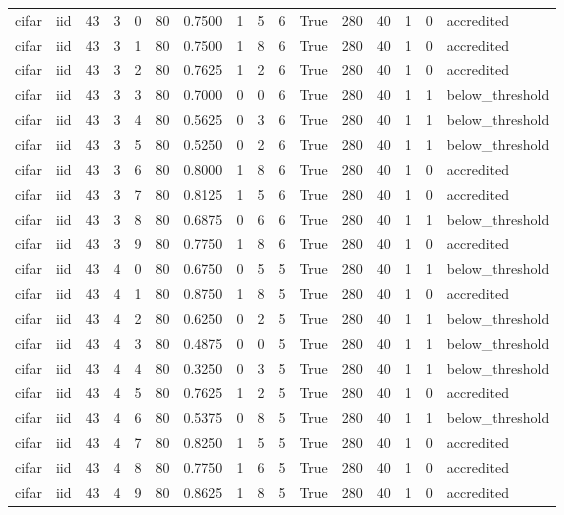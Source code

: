 \begin{tabular}{llrrrrrrrrrrrrrl}
cifar & iid & 43 & 3 & 0 & 80 & 0.7500 & 1 & 5 & 6 & True & 280 & 40 & 1 & 0 & accredited \\
cifar & iid & 43 & 3 & 1 & 80 & 0.7500 & 1 & 8 & 6 & True & 280 & 40 & 1 & 0 & accredited \\
cifar & iid & 43 & 3 & 2 & 80 & 0.7625 & 1 & 2 & 6 & True & 280 & 40 & 1 & 0 & accredited \\
cifar & iid & 43 & 3 & 3 & 80 & 0.7000 & 0 & 0 & 6 & True & 280 & 40 & 1 & 1 & below\_threshold \\
cifar & iid & 43 & 3 & 4 & 80 & 0.5625 & 0 & 3 & 6 & True & 280 & 40 & 1 & 1 & below\_threshold \\
cifar & iid & 43 & 3 & 5 & 80 & 0.5250 & 0 & 2 & 6 & True & 280 & 40 & 1 & 1 & below\_threshold \\
cifar & iid & 43 & 3 & 6 & 80 & 0.8000 & 1 & 8 & 6 & True & 280 & 40 & 1 & 0 & accredited \\
cifar & iid & 43 & 3 & 7 & 80 & 0.8125 & 1 & 5 & 6 & True & 280 & 40 & 1 & 0 & accredited \\
cifar & iid & 43 & 3 & 8 & 80 & 0.6875 & 0 & 6 & 6 & True & 280 & 40 & 1 & 1 & below\_threshold \\
cifar & iid & 43 & 3 & 9 & 80 & 0.7750 & 1 & 8 & 6 & True & 280 & 40 & 1 & 0 & accredited \\
cifar & iid & 43 & 4 & 0 & 80 & 0.6750 & 0 & 5 & 5 & True & 280 & 40 & 1 & 1 & below\_threshold \\
cifar & iid & 43 & 4 & 1 & 80 & 0.8750 & 1 & 8 & 5 & True & 280 & 40 & 1 & 0 & accredited \\
cifar & iid & 43 & 4 & 2 & 80 & 0.6250 & 0 & 2 & 5 & True & 280 & 40 & 1 & 1 & below\_threshold \\
cifar & iid & 43 & 4 & 3 & 80 & 0.4875 & 0 & 0 & 5 & True & 280 & 40 & 1 & 1 & below\_threshold \\
cifar & iid & 43 & 4 & 4 & 80 & 0.3250 & 0 & 3 & 5 & True & 280 & 40 & 1 & 1 & below\_threshold \\
cifar & iid & 43 & 4 & 5 & 80 & 0.7625 & 1 & 2 & 5 & True & 280 & 40 & 1 & 0 & accredited \\
cifar & iid & 43 & 4 & 6 & 80 & 0.5375 & 0 & 8 & 5 & True & 280 & 40 & 1 & 1 & below\_threshold \\
cifar & iid & 43 & 4 & 7 & 80 & 0.8250 & 1 & 5 & 5 & True & 280 & 40 & 1 & 0 & accredited \\
cifar & iid & 43 & 4 & 8 & 80 & 0.7750 & 1 & 6 & 5 & True & 280 & 40 & 1 & 0 & accredited \\
cifar & iid & 43 & 4 & 9 & 80 & 0.8625 & 1 & 8 & 5 & True & 280 & 40 & 1 & 0 & accredited \\

\end{tabular}
